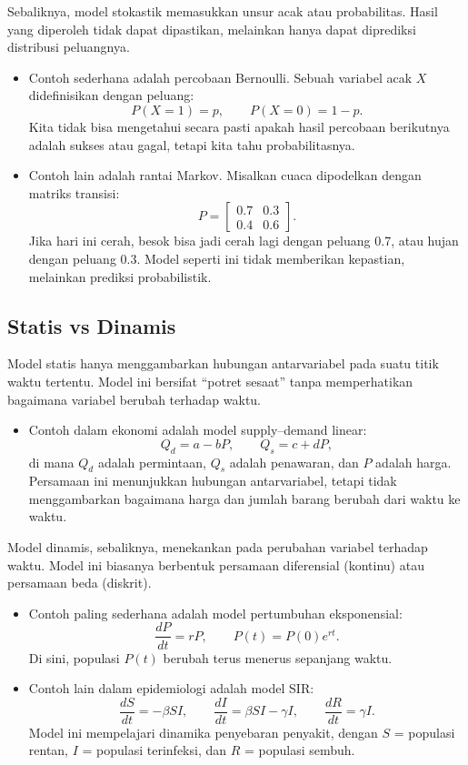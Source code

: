 \documentclass{bukumjh}
\begin{document}
Sebaliknya, {\jsg model stokastik} memasukkan unsur acak atau probabilitas. Hasil yang diperoleh tidak dapat dipastikan, melainkan hanya dapat diprediksi distribusi peluangnya.  

\begin{itemize}
    \item Contoh sederhana adalah percobaan Bernoulli. Sebuah variabel acak $X$ didefinisikan dengan peluang:
    \[
    P(X=1)=p, \qquad P(X=0)=1-p.
    \]
    Kita tidak bisa mengetahui secara pasti apakah hasil percobaan berikutnya adalah sukses atau gagal, tetapi kita tahu probabilitasnya.
    
    \item Contoh lain adalah rantai Markov. Misalkan cuaca dipodelkan dengan matriks transisi:
    \[
    P = \begin{bmatrix}
    0.7 & 0.3 \\
    0.4 & 0.6
    \end{bmatrix}.
    \]
    Jika hari ini cerah, besok bisa jadi cerah lagi dengan peluang 0.7, atau hujan dengan peluang 0.3. Model seperti ini tidak memberikan kepastian, melainkan prediksi probabilistik.
\end{itemize}

\subsection{Statis vs Dinamis}

{\jsg Model statis} hanya menggambarkan hubungan antarvariabel pada suatu titik waktu tertentu. Model ini bersifat “potret sesaat” tanpa memperhatikan bagaimana variabel berubah terhadap waktu.  

\begin{itemize}
    \item Contoh dalam ekonomi adalah model supply–demand linear:
    \[
    Q_d = a - bP, \qquad Q_s = c + dP,
    \]
    di mana $Q_d$ adalah permintaan, $Q_s$ adalah penawaran, dan $P$ adalah harga. Persamaan ini menunjukkan hubungan antarvariabel, tetapi tidak menggambarkan bagaimana harga dan jumlah barang berubah dari waktu ke waktu.
\end{itemize}

{\jsg Model dinamis}, sebaliknya, menekankan pada perubahan variabel terhadap waktu. Model ini biasanya berbentuk persamaan diferensial (kontinu) atau persamaan beda (diskrit).  

\begin{itemize}
    \item Contoh paling sederhana adalah model pertumbuhan eksponensial:
    \[
    \frac{dP}{dt} = rP, \qquad P(t) = P(0)e^{rt}.
    \]
    Di sini, populasi $P(t)$ berubah terus menerus sepanjang waktu.
    
    \item Contoh lain dalam epidemiologi adalah model SIR:
    \[
    \frac{dS}{dt} = -\beta SI, \qquad
    \frac{dI}{dt} = \beta SI - \gamma I, \qquad
    \frac{dR}{dt} = \gamma I.
    \]
    Model ini mempelajari dinamika penyebaran penyakit, dengan $S$ = populasi rentan, $I$ = populasi terinfeksi, dan $R$ = populasi sembuh.
\end{itemize}
\end{document}
